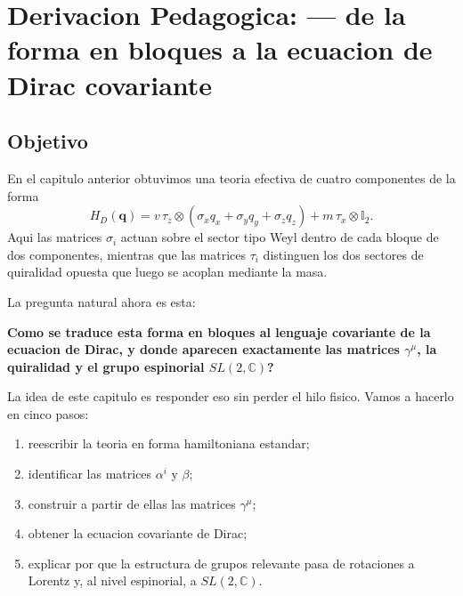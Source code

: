 \chapter{Derivacion Pedagogica: --- de la forma en bloques a la ecuacion de Dirac covariante}
\label{ch:de-bloques-a-gamma-sl2c}







\section{Objetivo}
En el capitulo anterior obtuvimos una teoria efectiva de cuatro componentes de la forma
\begin{equation}
H_D(\bm{q}) = v\,\tau_z\otimes(\sigma_x q_x+\sigma_y q_y+\sigma_z q_z)+m\,\tau_x\otimes \mathbb{I}_2.
\label{c15:eq:HDbloques}
\end{equation}
Aqui las matrices $\sigma_i$ actuan sobre el sector tipo Weyl dentro de cada bloque de dos componentes, mientras que las matrices $\tau_i$ distinguen los dos sectores de quiralidad opuesta que luego se acoplan mediante la masa.

La pregunta natural ahora es esta:
\begin{displayquote}
\textbf{Como se traduce esta forma en bloques al lenguaje covariante de la ecuacion de Dirac, y donde aparecen exactamente las matrices $\gamma^\mu$, la quiralidad y el grupo espinorial $SL(2,\mathbb{C})$?}
\end{displayquote}

La idea de este capitulo es responder eso sin perder el hilo fisico. Vamos a hacerlo en cinco pasos:
\begin{enumerate}[label=\arabic*.]
    \item reescribir la teoria en forma hamiltoniana estandar;
    \item identificar las matrices $\alpha^i$ y $\beta$;
    \item construir a partir de ellas las matrices $\gamma^\mu$;
    \item obtener la ecuacion covariante de Dirac;
    \item explicar por que la estructura de grupos relevante pasa de rotaciones a Lorentz y, al nivel espinorial, a $SL(2,\mathbb{C})$.
\end{enumerate}

